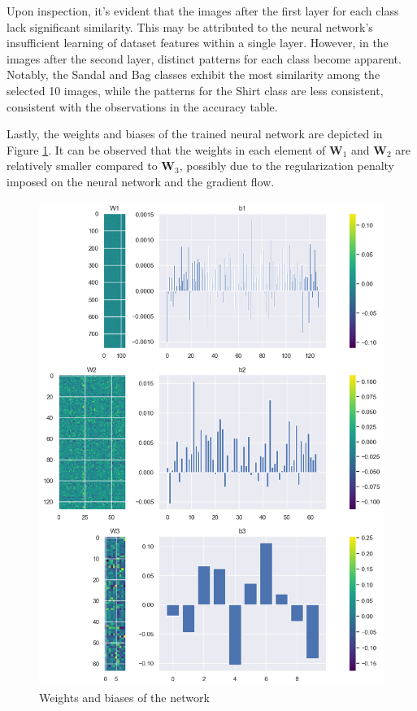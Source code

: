 \documentclass[10pt,a4paper,twoside]{tau}
\renewcommand{\vec}[1]{\mathbf{#1}}
\begin{document}
Upon inspection, it's evident that the images after the first layer for each class lack significant similarity. This may be attributed to the neural network's insufficient learning of dataset features within a single layer. However, in the images after the second layer, distinct patterns for each class become apparent. Notably, the Sandal and Bag classes exhibit the most similarity among the selected 10 images, while the patterns for the Shirt class are less consistent, consistent with the observations in the accuracy table.

Lastly, the weights and biases of the trained neural network are depicted in Figure \ref{fig:weight-biases}. It can be observed that the weights in each element of $\vec{W}_1$ and $\vec{W}_2$ are relatively smaller compared to $\vec{W}_3$, possibly due to the regularization penalty imposed on the neural network and the gradient flow.

\begin{figure}[]
\centering
\includegraphics[scale=0.4]{images/weight_biases.png}
\caption{Weights and biases of the network}
\label{fig:weight-biases}
\end{figure}
\end{document}
